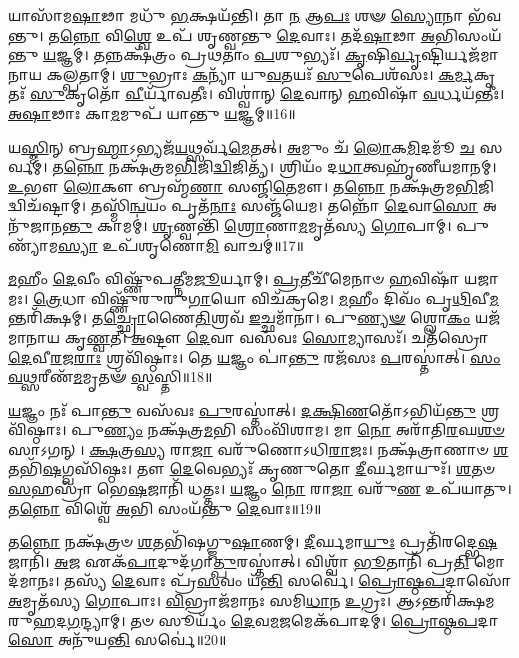 𑌯𑌾𑌸𑌾᳴𑌮\-\ul{𑌷𑌾}\-𑌢𑌾 𑌮𑌧𑍁᳴ \ul{𑌭}\-𑌕𑍍𑌷𑌯᳴𑌨𑍍𑌤𑌿।
𑌤𑌾 \ul{𑌨} 𑌆\-\ul{𑌪𑌃} 𑌶𑍟 \ul{𑌸𑍍𑌯𑍋}\-𑌨𑌾 𑌭᳴𑌵𑌨𑍍𑌤𑍁।
𑌤\-\ul{𑌨𑍍𑌨𑍋} 𑌵𑌿\-\ul{𑌶𑍍𑌵𑍇} 𑌉𑌪᳴ 𑌶𑍃𑌣𑍍𑌵𑌨𑍍𑌤𑍁 \ul{𑌦𑍇}\-𑌵𑌾𑌃।
𑌤𑌦᳴\-\ul{𑌷𑌾}\-𑌢𑌾 \ul{𑌅}\-𑌭𑌿𑌸𑌂𑌯᳴𑌨𑍍𑌤𑍁 \ul{𑌯}\-𑌜𑍍𑌞𑌮𑍍।
𑌤𑌨𑍍𑌨𑌕𑍍𑌷᳴𑌤𑍍𑌰𑌂 𑌪𑍍𑌰𑌥𑌤𑌾𑌂 \ul{𑌪}\-𑌶𑍁𑌭𑍍𑌯𑌃᳴।
\-\ul{𑌕𑍃}\-𑌷𑌿\-\ul{𑌰𑍍𑌵𑍃}\-𑌷𑍍𑌟𑌿𑌰𑍍𑌯𑌜᳴𑌮𑌾𑌨𑌾𑌯 𑌕𑌲𑍍𑌪𑌤𑌾𑌮𑍍।
\-\ul{𑌶𑍁}\-𑌭𑍍𑌰𑌾𑌃 \ul{𑌕}\-𑌨𑍍𑌯𑌾᳴ 𑌯𑍁\-\ul{𑌵}\-𑌤𑌯𑌃᳴ \ul{𑌸𑍁}\-𑌪𑍇𑌶᳴𑌸𑌃।
\-\ul{𑌕}\-\-\ul{𑌰𑍍𑌮}\-𑌕𑍃𑌤𑌃᳴ \ul{𑌸𑍁}\-𑌕𑍃𑌤𑍋᳴ \ul{𑌵𑍀}\-𑌰𑍍𑌯𑌾᳴𑌵𑌤𑍀𑌃।
𑌵𑌿𑌶𑍍𑌵𑌾॑𑌨𑍍 \ul{𑌦𑍇}\-𑌵𑌾𑌨𑍍 \ul{𑌹}\-𑌵𑌿𑌷𑌾᳴ \ul{𑌵}\-𑌰𑍍𑌧𑌯᳴𑌨𑍍𑌤𑍀𑌃।
\-\ul{𑌅}\-\-\ul{𑌷𑌾}\-𑌢𑌾𑌃 𑌕𑌾\-\ul{𑌮}\-𑌮𑍁𑌪᳴ 𑌯𑌾𑌨𑍍𑌤𑍁 \ul{𑌯}\-𑌜𑍍𑌞𑌮𑍍॥16॥

𑌯\-\ul{𑌸𑍍𑌮𑌿}\-𑌨𑍍 𑌬𑍍𑌰\-\ul{𑌹𑍍𑌮𑌾}\-\-𑌽𑌭𑍍𑌯𑌜᳴\-\ul{𑌯}\-𑌥𑍍𑌸𑌰𑍍𑌵᳴\-\ul{𑌮𑍇}\-𑌤𑌤𑍍।
\-\ul{𑌅}\-𑌮𑍁𑌂 𑌚᳴ \ul{𑌲𑍋}\-𑌕\-\ul{𑌮𑌿}\-𑌦𑌮𑍂᳴ \ul{𑌚} 𑌸𑌰𑍍𑌵𑌮𑍍॑।
𑌤\-\ul{𑌨𑍍𑌨𑍋} 𑌨𑌕𑍍𑌷᳴𑌤𑍍𑌰𑌮\-\ul{𑌭𑌿}\-𑌜𑌿\-\ul{𑌦𑍍𑌵𑌿}\-𑌜𑌿𑌤𑍍𑌯᳴।
𑌶𑍍𑌰𑌿𑌯𑌂᳴ 𑌦\-\ul{𑌧𑌾}\-𑌤𑍍𑌵𑌹𑍃᳴𑌣𑍀𑌯\-𑌮𑌾𑌨𑌮𑍍।
\-\ul{𑌉}\-𑌭𑍗 \ul{𑌲𑍋}\-𑌕𑍗 𑌬𑍍𑌰𑌹𑍍𑌮᳴\-\ul{𑌣𑌾} 𑌸𑌞𑍍𑌜𑌿᳴\-\ul{𑌤𑍇}\-𑌮𑍗।
𑌤\-\ul{𑌨𑍍𑌨𑍋} 𑌨𑌕𑍍𑌷᳴𑌤𑍍𑌰𑌮\-\ul{𑌭𑌿}\-𑌜𑌿𑌦𑍍𑌵𑌿𑌚᳴𑌷𑍍𑌟𑌾𑌮𑍍।
𑌤𑌸𑍍𑌮𑌿᳴\-\ul{𑌨𑍍𑌵}\-𑌯𑌂 𑌪𑍃𑌤᳴\-\ul{𑌨𑌾𑌃} 𑌸𑌞𑍍𑌜᳴𑌯𑍇𑌮।
𑌤𑌨𑍍𑌨𑍋᳴ \ul{𑌦𑍇}\-𑌵𑌾\-\ul{𑌸𑍋} 𑌅𑌨𑍁᳴𑌜𑌾𑌨\-\ul{𑌨𑍍𑌤𑍁} 𑌕𑌾𑌮𑌮𑍍॑।
\-\ul{𑌶𑍃}\-𑌣𑍍𑌵𑌨𑍍𑌤𑌿᳴ \ul{𑌶𑍍𑌰𑍋}\-𑌣𑌾\-\ul{𑌮}\-𑌮𑍃𑌤᳴𑌸𑍍𑌯 \ul{𑌗𑍋}\-𑌪𑌾𑌮𑍍।
𑌪𑍁𑌣𑍍𑌯𑌾᳴𑌮\-\ul{𑌸𑍍𑌯𑌾} 𑌉𑌪᳴𑌶𑍃𑌣𑍋\-\ul{𑌮𑌿} 𑌵𑌾𑌚𑌮𑍍॑॥17॥


\-\ul{𑌮}\-𑌹𑍀𑌂 \ul{𑌦𑍇}\-𑌵𑍀𑌂 𑌵𑌿𑌷𑍍𑌣𑍁᳴𑌪𑌤𑍍𑌨𑍀𑌮\-\ul{𑌜𑍂}\-𑌰𑍍𑌯𑌾𑌮𑍍।
\-\ul{𑌪𑍍𑌰}\-𑌤𑍀𑌚𑍀᳴𑌮𑍇𑌨𑌾𑍞 \ul{𑌹}\-𑌵𑌿𑌷𑌾᳴ 𑌯𑌜𑌾𑌮𑌃।
\-\ul{𑌤𑍍𑌰𑍇}\-𑌧𑌾 𑌵𑌿𑌷𑍍𑌣𑍁᳴𑌰𑍁𑌰𑍁\-\ul{𑌗𑌾}\-𑌯𑍋 𑌵𑌿𑌚᳴𑌕𑍍𑌰𑌮𑍇।
\-\ul{𑌮}\-𑌹𑍀𑌂 𑌦𑌿𑌵𑌂᳴ 𑌪𑍃\-\ul{𑌥𑌿}\-𑌵𑍀\-\ul{𑌮}\-𑌨𑍍𑌤𑌰𑌿᳴𑌕𑍍𑌷𑌮𑍍।
𑌤\-\ul{𑌚𑍍𑌛𑍍𑌰𑍋}\-𑌣𑍈\-\ul{𑌤𑌿}\-𑌶𑍍𑌰𑌵᳴ \ul{𑌇}\-𑌚𑍍𑌛𑌮𑌾᳴𑌨𑌾।
𑌪𑍁\-\ul{𑌣𑍍𑌯}\-\-\ul{𑍟} 𑌶𑍍𑌲𑍋\-\ul{𑌕𑌂} 𑌯𑌜᳴𑌮𑌾𑌨𑌾𑌯 𑌕𑍃\-\ul{𑌣𑍍𑌵}\-𑌤𑍀।
\-\ul{𑌅}\-𑌷𑍍𑌟𑍗 \ul{𑌦𑍇}\-𑌵𑌾 𑌵𑌸᳴𑌵𑌃 \ul{𑌸𑍋}\-𑌮𑍍𑌯𑌾𑌸𑌃᳴।
𑌚𑌤᳴𑌸𑍍𑌰𑍋 \ul{𑌦𑍇}\-𑌵𑍀\-\ul{𑌰}\-𑌜\-\ul{𑌰𑌾𑌃} 𑌶𑍍𑌰𑌵𑌿᳴𑌷𑍍𑌠𑌾𑌃।
𑌤𑍇 \ul{𑌯}\-𑌜𑍍𑌞𑌂 𑌪𑌾॑\-\ul{𑌨𑍍𑌤𑍁} 𑌰𑌜᳴𑌸𑌃 \ul{𑌪}\-𑌰𑌸𑍍𑌤𑌾॑𑌤𑍍।
\-\ul{𑌸𑌂}\-\-\ul{𑌵}\-\-\ul{𑌥𑍍𑌸}\-𑌰𑍀𑌣᳴\-\ul{𑌮}\-𑌮𑍃𑌤𑍟᳴ \ul{𑌸𑍍𑌵}\-𑌸𑍍𑌤𑌿॥18॥

\-\ul{𑌯}\-𑌜𑍍𑌞𑌂 𑌨𑌃᳴ 𑌪𑌾\-\ul{𑌨𑍍𑌤𑍁} 𑌵𑌸᳴𑌵𑌃 \ul{𑌪𑍁}\-𑌰𑌸𑍍𑌤𑌾॑𑌤𑍍।
\-\ul{𑌦}\-\-\ul{𑌕𑍍𑌷𑌿}\-\-\ul{𑌣}\-𑌤𑍋᳴\-𑌽𑌭𑌿𑌯᳴\-\ul{𑌨𑍍𑌤𑍁} 𑌶𑍍𑌰𑌵𑌿᳴𑌷𑍍𑌠𑌾𑌃।
𑌪𑍁\-\ul{𑌣𑍍𑌯𑌂} 𑌨𑌕𑍍𑌷᳴𑌤𑍍𑌰\-\ul{𑌮}\-𑌭𑌿 𑌸𑌂𑌵𑌿᳴𑌶𑌾𑌮।
𑌮𑌾 \ul{𑌨𑍋} 𑌅𑌰𑌾᳴𑌤𑌿\-\ul{𑌰}\-𑌘\-\ul{𑌶}\-\-\ul{𑍞}\-𑌸𑌾\-𑌽𑌗𑌨𑍍।
\-\ul{𑌕𑍍𑌷}\-𑌤𑍍𑌰\-\ul{𑌸𑍍𑌯} 𑌰𑌾\-\ul{𑌜𑌾} 𑌵𑌰𑍁᳴𑌣𑍋\-𑌽𑌧𑌿\-\ul{𑌰𑌾}\-𑌜𑌃।
𑌨𑌕𑍍𑌷᳴𑌤𑍍𑌰𑌾𑌣𑌾𑍞 \ul{𑌶}\-𑌤𑌭𑌿᳴\-\ul{𑌷}\-𑌗𑍍𑌵𑌸𑌿᳴𑌷𑍍𑌠𑌃।
𑌤𑍗 \ul{𑌦𑍇}\-𑌵𑍇𑌭𑍍𑌯𑌃᳴ 𑌕𑍃𑌣𑍁𑌤𑍋 \ul{𑌦𑍀}\-𑌰𑍍𑌘𑌮𑌾𑌯𑍁𑌃᳴।
\-\ul{𑌶}\-𑌤𑍞 \ul{𑌸}\-𑌹𑌸𑍍𑌰𑌾᳴ 𑌭𑍇\-\ul{𑌷}\-𑌜𑌾𑌨𑌿᳴ 𑌧𑌤𑍍𑌤𑌃।
\-\ul{𑌯}\-𑌜𑍍𑌞𑌂 \ul{𑌨𑍋} 𑌰𑌾\-\ul{𑌜𑌾} 𑌵𑌰𑍁᳴\-\ul{𑌣} 𑌉𑌪᳴𑌯𑌾𑌤𑍁।
𑌤\-\ul{𑌨𑍍𑌨𑍋} 𑌵𑌿𑌶𑍍𑌵𑍇᳴ \ul{𑌅}\-𑌭𑌿 𑌸𑌂𑌯᳴𑌨𑍍𑌤𑍁 \ul{𑌦𑍇}\-𑌵𑌾𑌃॥19॥

𑌤\-\ul{𑌨𑍍𑌨𑍋} 𑌨𑌕𑍍𑌷᳴𑌤𑍍𑌰𑍞 \ul{𑌶}\-𑌤𑌭𑌿᳴𑌷𑌗𑍍𑌜𑍁\-\ul{𑌷𑌾}\-𑌣𑌮𑍍।
\-\ul{𑌦𑍀}\-𑌰𑍍𑌘𑌮𑌾\-\ul{𑌯𑍁𑌃} 𑌪𑍍𑌰𑌤𑌿᳴\-𑌰𑌦𑍍𑌭𑍇\-\ul{𑌷}\-𑌜𑌾𑌨𑌿᳴।
\-\ul{𑌅}\-𑌜 𑌏𑌕᳴\-\ul{𑌪𑌾}\-𑌦𑍁𑌦᳴𑌗𑌾\-\ul{𑌤𑍍𑌪𑍁}\-𑌰𑌸𑍍𑌤𑌾॑𑌤𑍍।
𑌵𑌿𑌶𑍍𑌵𑌾᳴ \ul{𑌭𑍂}\-𑌤𑌾𑌨𑌿᳴ 𑌪𑍍𑌰\-\ul{𑌤𑌿} 𑌮𑍋𑌦᳴𑌮𑌾𑌨𑌃।
𑌤𑌸𑍍𑌯᳴ \ul{𑌦𑍇}\-𑌵𑌾𑌃 𑌪𑍍𑌰᳴\-\ul{𑌸}\-𑌵𑌂 𑌯᳴\-\ul{𑌨𑍍𑌤𑌿} 𑌸𑌰𑍍𑌵𑍇॑।
\-\ul{𑌪𑍍𑌰𑍋}\-\-\ul{𑌷𑍍𑌠}\-\-\ul{𑌪}\-𑌦𑌾𑌸𑍋᳴ \ul{𑌅}\-𑌮𑍃𑌤᳴𑌸𑍍𑌯 \ul{𑌗𑍋}\-𑌪𑌾𑌃।
\-\ul{𑌵𑌿}\-𑌭𑍍𑌰𑌾𑌜᳴𑌮𑌾𑌨𑌃 𑌸𑌮𑌿\-\ul{𑌧𑌾}\-𑌨 \ul{𑌉}\-𑌗𑍍𑌰𑌃।
𑌆𑌽𑌨𑍍𑌤𑌰𑌿᳴𑌕𑍍𑌷𑌮𑌰𑍁\-\ul{𑌹}\-𑌦\-\ul{𑌗}\-𑌨𑍍𑌦𑍍𑌯𑌾𑌮𑍍।
𑌤𑍞 𑌸𑍂𑌰𑍍𑌯𑌂᳴ \ul{𑌦𑍇}\-𑌵\-\ul{𑌮}\-𑌜𑌮𑍇𑌕᳴𑌪𑌾𑌦𑌮𑍍।
\-\ul{𑌪𑍍𑌰𑍋}\-\-\ul{𑌷𑍍𑌠}\-\-\ul{𑌪}\-𑌦𑌾\-\ul{𑌸𑍋} 𑌅𑌨𑍁᳴𑌯\-\ul{𑌨𑍍𑌤𑌿} 𑌸𑌰𑍍𑌵𑍇॑॥20॥


